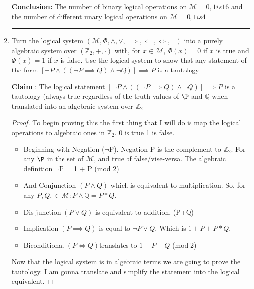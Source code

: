 \documentclass[10pt, AMS Euler]{article}
\newcommand{\Z}{\mathbb{Z}}
\newcommand{\Q}{\mathbb{Q}}
\begin{document}
\begin{enumerate}
\begin{proof}
\begin{itemize}
\begin{itemize}
                        \end{itemize}
                \end{itemize}
            \end{proof}
        \item[\bf{Conclusion}:] The number of binary logical operations on $\mathcal{M} = {0,1} is 16$ and the number of different unary logical operations on $\mathcal{M} = {0,1} is 4$\\
\noindent\rule{\textwidth}{0.4pt}
	\item Turn the logical system $(\mathcal{M}, \Phi, \wedge, \vee, \implies, \Longleftarrow, \Longleftrightarrow, \neg)$ into a purely algebraic system over $(\Z_2, +,\cdot)$ with, for $x \in \mathcal{M}$, $\Phi(x) = 0$ if $x$ is true and $\Phi(x) = 1$ if $x$ is false. Use the logical system to show that any statement of the form $[\neg P \wedge ((\neg P \implies Q) \wedge \neg Q)] \implies P$ is a tautology.
        \item[\bf{Claim}]: The logical statement $[\neg P \wedge ((\neg P \implies Q) \wedge \neg Q)] \implies P$ is a tautology (always true regardless of the truth values of $\P$ and $\Q$ when translated into an algebraic system over $\Z_{2}$
            \begin{proof}
                To begin proving this the first thing that I will do is map the logical operations to algebraic ones in $\Z_{2}$. 0 is true 1 is false. 
                \begin{itemize}
                    \item Beginning with Negation ($\neg$P). Negation P is the complement to $\Z_{2}$. For any $\P$ in the set of $\mathcal{M}$, and true of false/vise-versa. The algebraic definition $\neg$P = 1 + P (mod 2)
                    \item And Conjunction $(P \wedge Q)$ which is equivalent to multiplication. So, for any $P, Q, \in \mathcal{M}: P \wedge \Q = P * Q$.
                    \item Dis-junction $(P \vee Q)$ is equivalent to addition, (P+Q)
                    \item Implication $(P \implies Q)$ is equal to $\neg P \vee Q$. Which is $1 + P + P * Q$.
                    \item Biconditional $(P \Longleftrightarrow Q)$translates to $1 + P + Q$ (mod 2)
                \end{itemize}
                Now that the logical system is in algebraic terms we are going to prove the tautology. I am gonna translate and simplify the statement into the logical equivalent.

\end{proof}
\end{enumerate}
\end{document}
